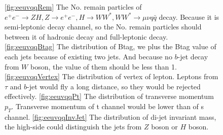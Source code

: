 \documentclass[11pt,a4paper]{cepcnote}
\begin{document}
\begin{figure}[H]
{	\label{fig:eeuvqqPt}
}
\caption[]{
	\ref{fig:eeuvqqRem} The No. remain particles of $e^+e^-\rightarrow ZH, Z\rightarrow e^+e^-, H\rightarrow WW^*,  
	WW^*\rightarrow \mu\nu q\bar{q}$ decay. 
	Because it is semi-leptonic decay channel, so the No. remain particles should between it of hadronic decay and full-leptonic decay.
	\ref{fig:eeuvqqBtag} The distribution of Btag, we plus the Btag value of each jets because of existing two jets. And because no $b$-jet 
	decay from $W$ boson, the value of them should be less than 1.
	\ref{fig:eeuvqqVertex} The distribution of vertex of lepton. Leptons from $\tau$ and $b$-jet would fly a long distance, 
	so they would be rejected effectively.
	\ref{fig:eeuvqqPt} The distribution of transverse momentum $p_T$. Transverse momentum of t channel would be lower than of s channel.
	\ref{fig:eeuvqqInvJet} The distribution of di-jet invariant mass, the high-side could distinguish the jets from $Z$ boson or $H$ boson.
	}
\label{fig:eeuvqqfourcut}
\end{figure}
\end{document}
